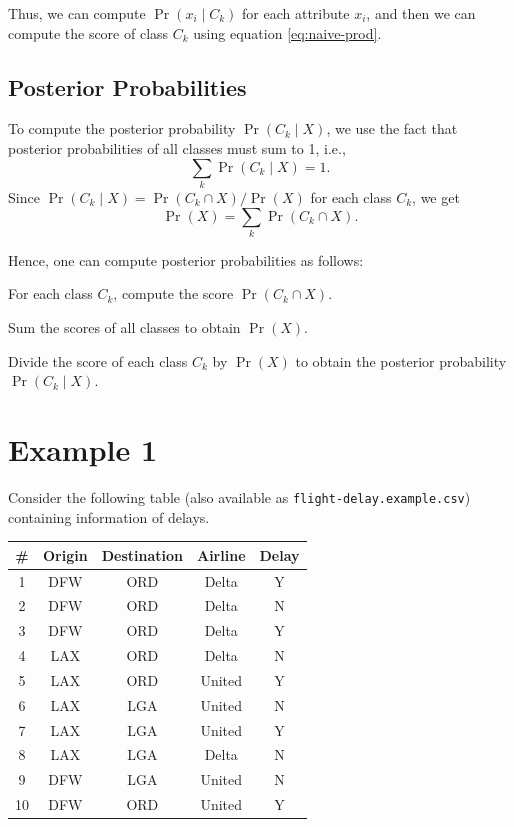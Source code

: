 \documentclass[11pt]{article}
\begin{document}
Thus, we can compute $\Pr(x_i \mid C_k)$ for each attribute $x_i$,
and then we can compute the score of class $C_k$ using equation \eqref{eq:naive-prod}.

\subsection{Posterior Probabilities}

To compute the posterior probability $\Pr(C_k \mid X)$, we use the fact that
posterior probabilities of all classes must sum to 1, i.e.,
\begin{equation}
\sum_k \Pr(C_k \mid X) = 1.
\end{equation}
Since $\Pr(C_k \mid X) = \Pr(C_k \cap X)/\Pr(X)$ for each class $C_k$, we get
\begin{equation}
\Pr(X) = \sum_k \Pr(C_k \cap X).
\end{equation}

Hence, one can compute posterior probabilities as follows:
\begin{tightenum}
\item For each class $C_k$, compute the score $\Pr(C_k \cap X)$.
\item Sum the scores of all classes to obtain $\Pr(X)$.
\item Divide the score of each class $C_k$ by $\Pr(X)$ to obtain the posterior probability $\Pr(C_k \mid X)$.
\end{tightenum}

\section{Example 1}

Consider the following table (also available as \texttt{flight-delay.example.csv})
containing information of delays.

\begin{center}
\begin{tabular}{ccccc}
\toprule
\# & Origin & Destination & Airline & Delay
\\ \midrule
1 & DFW & ORD & Delta & Y \\
2 & DFW & ORD & Delta & N \\
3 & DFW & ORD & Delta & Y \\
4 & LAX & ORD & Delta & N \\
5 & LAX & ORD & United & Y \\
6 & LAX & LGA & United & N \\
7 & LAX & LGA & United & Y \\
8 & LAX & LGA & Delta & N \\
9 & DFW & LGA & United & N \\
10& DFW & ORD & United & Y \\
\bottomrule
\end{tabular}
\end{center}
\end{document}
